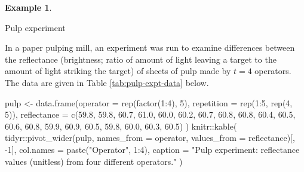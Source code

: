 \documentclass[
]{book}
\newenvironment{Shaded}{\begin{snugshade}}{\end{snugshade}}
\newcommand{\AttributeTok}[1]{\textcolor[rgb]{0.77,0.63,0.00}{#1}}
\newcommand{\DecValTok}[1]{\textcolor[rgb]{0.00,0.00,0.81}{#1}}
\newcommand{\FloatTok}[1]{\textcolor[rgb]{0.00,0.00,0.81}{#1}}
\newcommand{\FunctionTok}[1]{\textcolor[rgb]{0.00,0.00,0.00}{#1}}
\newcommand{\NormalTok}[1]{#1}
\newcommand{\OtherTok}[1]{\textcolor[rgb]{0.56,0.35,0.01}{#1}}
\newcommand{\SpecialCharTok}[1]{\textcolor[rgb]{0.00,0.00,0.00}{#1}}
\newcommand{\StringTok}[1]{\textcolor[rgb]{0.31,0.60,0.02}{#1}}
\theoremstyle{definition}
\theoremstyle{definition}
\newtheorem{example}{Example}[chapter]
\theoremstyle{definition}
\theoremstyle{definition}
\theoremstyle{remark}
\begin{document}
\begin{example}
\protect\hypertarget{exm:one-way}{}\label{exm:one-way}

Pulp experiment \citep[ch.~2]{WH2009}

In a paper pulping mill, an experiment was run to examine differences between the reflectance (brightness; ratio of amount of light leaving a target to the amount of light striking the target) of sheets of pulp made by \(t=4\) operators. The data are given in Table \ref{tab:pulp-expt-data} below.

\begin{Shaded}
\begin{Highlighting}[]
\NormalTok{pulp }\OtherTok{\textless{}{-}} \FunctionTok{data.frame}\NormalTok{(}\AttributeTok{operator =} \FunctionTok{rep}\NormalTok{(}\FunctionTok{factor}\NormalTok{(}\DecValTok{1}\SpecialCharTok{:}\DecValTok{4}\NormalTok{), }\DecValTok{5}\NormalTok{),}
                   \AttributeTok{repetition =} \FunctionTok{rep}\NormalTok{(}\DecValTok{1}\SpecialCharTok{:}\DecValTok{5}\NormalTok{, }\FunctionTok{rep}\NormalTok{(}\DecValTok{4}\NormalTok{, }\DecValTok{5}\NormalTok{)), }
                   \AttributeTok{reflectance =} \FunctionTok{c}\NormalTok{(}\FloatTok{59.8}\NormalTok{, }\FloatTok{59.8}\NormalTok{, }\FloatTok{60.7}\NormalTok{, }\FloatTok{61.0}\NormalTok{, }\FloatTok{60.0}\NormalTok{, }\FloatTok{60.2}\NormalTok{, }\FloatTok{60.7}\NormalTok{, }\FloatTok{60.8}\NormalTok{, }
                                    \FloatTok{60.8}\NormalTok{, }\FloatTok{60.4}\NormalTok{, }\FloatTok{60.5}\NormalTok{, }\FloatTok{60.6}\NormalTok{, }\FloatTok{60.8}\NormalTok{, }\FloatTok{59.9}\NormalTok{, }\FloatTok{60.9}\NormalTok{, }\FloatTok{60.5}\NormalTok{, }\FloatTok{59.8}\NormalTok{, }\FloatTok{60.0}\NormalTok{, }\FloatTok{60.3}\NormalTok{, }\FloatTok{60.5}\NormalTok{)}
\NormalTok{                     )}
\NormalTok{knitr}\SpecialCharTok{::}\FunctionTok{kable}\NormalTok{(}
\NormalTok{ tidyr}\SpecialCharTok{::}\FunctionTok{pivot\_wider}\NormalTok{(pulp, }\AttributeTok{names\_from =}\NormalTok{ operator, }\AttributeTok{values\_from =}\NormalTok{ reflectance)[, }\SpecialCharTok{{-}}\DecValTok{1}\NormalTok{],}
 \AttributeTok{col.names =} \FunctionTok{paste}\NormalTok{(}\StringTok{"Operator"}\NormalTok{, }\DecValTok{1}\SpecialCharTok{:}\DecValTok{4}\NormalTok{),}
 \AttributeTok{caption =} \StringTok{"Pulp experiment: reflectance values (unitless) from four different operators."}
\NormalTok{)}
\end{Highlighting}
\end{Shaded}


\end{example}
\end{document}
